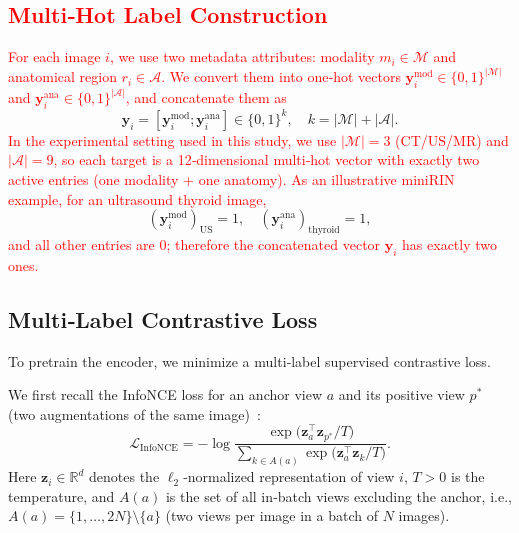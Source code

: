 \documentclass[final,1p,times]{elsarticle}
\newcommand{\revadd}[1]{\textcolor{red}{#1}}
\begin{document}
\subsection{\revadd{Multi‑Hot Label Construction}}
\revadd{For each image $i$, we use two metadata attributes: modality $m_i \in \mathcal{M}$ and anatomical region $r_i \in \mathcal{A}$.}
\revadd{We convert them into one‑hot vectors $\mathbf y_i^{\mathrm{mod}}\in\{0,1\}^{|\mathcal{M}|}$ and $\mathbf y_i^{\mathrm{ana}}\in\{0,1\}^{|\mathcal{A}|}$, and concatenate them as}
{\color{red}
\[
\mathbf y_i=[\mathbf y_i^{\mathrm{mod}};\mathbf y_i^{\mathrm{ana}}]\in\{0,1\}^{k},
\quad k=|\mathcal{M}|+|\mathcal{A}|.
\]
}
\revadd{In the experimental setting used in this study, we use $|\mathcal{M}|=3$ (CT/US/MR) and $|\mathcal{A}|=9$, so each target is a 12‑dimensional multi‑hot vector with exactly two active entries (one modality + one anatomy).}
\revadd{As an illustrative miniRIN example, for an ultrasound thyroid image,}
{\color{red}
\[
(\mathbf y_i^{\mathrm{mod}})_{\mathrm{US}}=1,\quad
(\mathbf y_i^{\mathrm{ana}})_{\mathrm{thyroid}}=1,
\]
}
\revadd{and all other entries are $0$; therefore the concatenated vector $\mathbf y_i$ has exactly two ones.}

\subsection{Multi‑Label Contrastive Loss}
To pretrain the encoder, we minimize a multi‑label supervised contrastive loss.

We first recall the InfoNCE loss for an anchor view $a$ and its positive view $p^\ast$ (two augmentations of the same image)~\cite{oord_representation_2018}:
\begin{equation}
  \mathcal{L}_{\mathrm{InfoNCE}}
  = -\log
    \frac{\exp\!\bigl(\mathbf z_a^{\top}\mathbf z_{p^\ast}/T\bigr)}
         {\displaystyle\sum_{k \in A(a)}
          \exp\!\bigl(\mathbf z_a^{\top}\mathbf z_k / T\bigr)} .
  \label{eq:step1}
\end{equation}
Here $\mathbf z_i \in \mathbb{R}^d$ denotes the $\ell_2$‑normalized representation of view $i$, $T>0$ is the temperature, and $A(a)$ is the set of all in‑batch views excluding the anchor, i.e., $A(a)=\{1,\ldots,2N\}\setminus\{a\}$ (two views per image in a batch of $N$ images).
\end{document}
